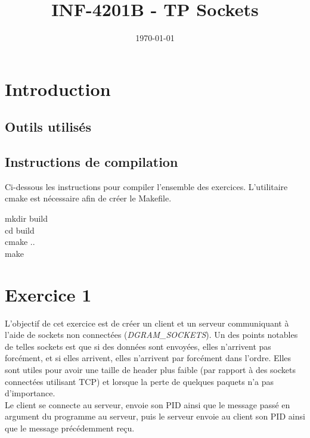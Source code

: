 \documentclass[a4paper, frenchb, 11pt]{article}
\title{
	\textbf{INF-4201B - TP Sockets}\\
}
\date{\today}
\begin{document}
\maketitle
\newpage

\tableofcontents
\newpage

\section{Introduction}

\subsection{Outils utilisés}

\subsection{Instructions de compilation}
Ci-dessous les instructions pour compiler l'ensemble des exercices. L'utilitaire cmake est nécessaire afin de créer le Makefile.

\begin{mdframed}[backgroundcolor=lightblue, linecolor=darkblue]
	mkdir build\\
	cd build\\
	cmake ..\\
	make
\end{mdframed}
\newpage

\section{Exercice 1}
L'objectif de cet exercice est de créer un client et un serveur communiquant à l'aide de sockets non connectées (\emph{DGRAM\_SOCKETS}). Un des points notables de telles sockets est que si des données sont envoyées, elles n'arrivent pas forcément, et si elles arrivent, elles n'arrivent par forcément dans l'ordre. Elles sont utiles pour avoir une taille de header plus faible (par rapport à des sockets connectées utilisant TCP) et lorsque la perte de quelques paquets n'a pas d'importance.\\ %

Le client se connecte au serveur, envoie son PID ainsi que le message passé en argument du programme au serveur, puis le serveur envoie au client son PID ainsi que le message précédemment reçu.
\end{document}
